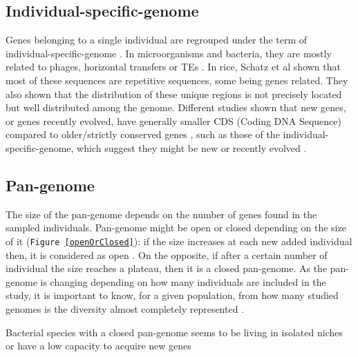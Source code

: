 \documentclass[a4paper,10pt,twoside]{report}
\begin{document}
\subsection{Individual-specific-genome}
\label{individual}
Genes belonging to a single individual are regrouped under the term of individual-specific-genome  \cite{Tettelin2005,Lukjancenko2013,Soares2013}. In microorganisms and bacteria, they are mostly related to phages, horizontal transfers or TEs \cite{Kahlke2013}. In rice, Schatz et al \cite{Schatz2014} shown that most of these sequences are repetitive sequences, some being genes related. They also shown that the distribution of these unique regions is not precisely located but well distributed among the genome. Different studies shown that new genes, or genes recently evolved, have generally smaller CDS (Coding DNA Sequence) compared to older/strictly conserved genes \cite{Cai2010, Capra2010, Lipman2002}, such as those of the individual-specific-genome, which suggest they might be new or recently evolved \cite{Schatz2014}.

\subsection{Pan-genome}
The size of the pan-genome depends on the number of genes found in the sampled individuals. Pan-genome might be open or closed depending on the size of it (\texttt{Figure~\ref{openOrClosed}}): if the size increases at each new added individual then, it is considered as open \cite{Mann2013}. On the opposite, if after a certain number of individual the size reaches a plateau, then it is a closed pan-genome. As the pan-genome is changing depending on how many individuals are included in the study, it is important to know, for a given population, from how many studied genomes is the diversity almost completely represented \cite{Tatusov1997,Tettelin2005,Hogg2007,Tettelin2008}.

Bacterial species with a closed pan-genome seems to be living in isolated niches or have a low capacity to acquire new genes \cite{Koonin2005}
\end{document}
